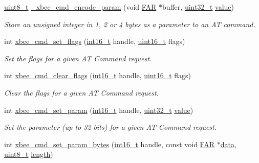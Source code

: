 \begin{DoxyCompactItemize}
\hyperlink{group__hal__dos_gae1affc9ca37cfb624959c866a73f83c2}{uint8\+\_\+t} \hyperlink{group__xbee__atcmd_ga484572705b9695ab429fd51188f74238}{\+\_\+xbee\+\_\+cmd\+\_\+encode\+\_\+param} (void \hyperlink{group__hal_gaef060b3456fdcc093a7210a762d5f2ed}{F\+AR} $\ast$buffer, \hyperlink{group__hal__dos_ga09a1e304d66d35dd47daffee9731edaa}{uint32\+\_\+t} \hyperlink{group__zcl_ga1ed5b151a90f7e99af8cca2e6875ddf4}{value})
\begin{DoxyCompactList}\small\item\em Store an unsigned integer in 1, 2 or 4 bytes as a parameter to an AT command. \end{DoxyCompactList}\item 
int \hyperlink{group__xbee__atcmd_gad2cc44803cc53ada37df4557313e120b}{xbee\+\_\+cmd\+\_\+set\+\_\+flags} (\hyperlink{group__hal__dos_ga2140805d08462d474b82ddc8d1c2f3e6}{int16\+\_\+t} handle, \hyperlink{group__hal__dos_ga5a8b2dc9e45a9ee81a94ef304fb62505}{uint16\+\_\+t} flags)
\begin{DoxyCompactList}\small\item\em Set the flags for a given AT Command request. \end{DoxyCompactList}\item 
int \hyperlink{group__xbee__atcmd_ga0828601d6b2735ee9f2ebf408d12c05c}{xbee\+\_\+cmd\+\_\+clear\+\_\+flags} (\hyperlink{group__hal__dos_ga2140805d08462d474b82ddc8d1c2f3e6}{int16\+\_\+t} handle, \hyperlink{group__hal__dos_ga5a8b2dc9e45a9ee81a94ef304fb62505}{uint16\+\_\+t} flags)
\begin{DoxyCompactList}\small\item\em Clear the flags for a given AT Command request. \end{DoxyCompactList}\item 
int \hyperlink{group__xbee__atcmd_ga4295dde3673b07f41e569e333abd9730}{xbee\+\_\+cmd\+\_\+set\+\_\+param} (\hyperlink{group__hal__dos_ga2140805d08462d474b82ddc8d1c2f3e6}{int16\+\_\+t} handle, \hyperlink{group__hal__dos_ga09a1e304d66d35dd47daffee9731edaa}{uint32\+\_\+t} \hyperlink{group__zcl_ga1ed5b151a90f7e99af8cca2e6875ddf4}{value})
\begin{DoxyCompactList}\small\item\em Set the parameter (up to 32-\/bits) for a given AT Command request. \end{DoxyCompactList}\item 
int \hyperlink{group__xbee__atcmd_ga6bd558a2d03eafe29b176f598d76ffd6}{xbee\+\_\+cmd\+\_\+set\+\_\+param\+\_\+bytes} (\hyperlink{group__hal__dos_ga2140805d08462d474b82ddc8d1c2f3e6}{int16\+\_\+t} handle, const void \hyperlink{group__hal_gaef060b3456fdcc093a7210a762d5f2ed}{F\+AR} $\ast$\hyperlink{group__xbee__io_gac5955aa1e44ff234e6d78a19cf68f25c}{data}, \hyperlink{group__hal__dos_gae1affc9ca37cfb624959c866a73f83c2}{uint8\+\_\+t} \hyperlink{group__zdo_gab2b3adeb2a67e656ff030b56727fd0ac}{length})

\end{DoxyCompactItemize}
